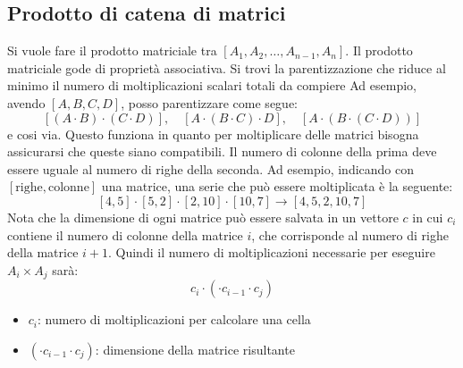 \subsection{Prodotto di catena di matrici}
Si vuole fare il prodotto matriciale tra $ \left[A_1, A_2,  \ldots, A_{n-1}, A_n \right] $. Il prodotto matriciale gode di proprietà associativa. Si trovi la parentizzazione che riduce al minimo il numero di moltiplicazioni scalari totali da compiere
\vskip3mm
Ad esempio, avendo $ \left[A, B, C, D\right] $, posso parentizzare come segue:
\[
	\left[\left(A \cdot B\right) \cdot \left(C \cdot D\right)\right], \quad \left[A \cdot \left(B \cdot C \right) \cdot D\right], \quad \left[A \cdot \left(B \cdot \left(C  \cdot D\right)\right)\right]
\]
e cosi via. Questo funziona in quanto per moltiplicare delle matrici bisogna assicurarsi che queste siano compatibili. Il numero di colonne della prima deve essere uguale al numero di righe della seconda. Ad esempio, indicando con $ \left[\text{righe}, \text{colonne}\right] $ una matrice, una serie che può essere moltiplicata è la seguente:
\[
	\left[4,5\right] \cdot \left[5, 2\right] \cdot \left[2, 10\right]  \cdot \left[10, 7\right] \rightarrow \left[4,5,2,10,7\right]
\]
\vskip3mm
Nota che la dimensione di ogni matrice può essere salvata in un vettore $ c $ in cui $ c_i $ contiene il numero di colonne della matrice $ i $, che corrisponde al numero di righe della matrice $ i+1 $. Quindi il numero di moltiplicazioni necessarie per eseguire $ A_i \times A_j $ sarà:
\[
	c_i \cdot (\cdot c_{i-1} \cdot c_j)
\]
\begin{itemize}
	\item $ c_i $: numero di moltiplicazioni per calcolare una cella
	\item $ (\cdot c_{i-1} \cdot c_j) $: dimensione della matrice risultante
\end{itemize}
\vskip3mm\vskip3mm
